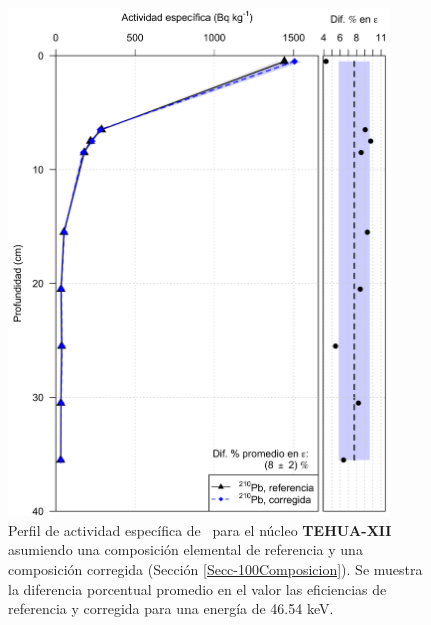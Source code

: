 \begin{figure}
\centering
\includegraphics[width=0.9\textwidth]{Imagenes/Act_210Pb_Agua_Composicion_TEHUA-XII.png}
\caption{Perfil de actividad específica de \PbCero\, para el núcleo \textbf{TEHUA-XII} asumiendo una composición elemental de referencia y una composición corregida (Sección \ref{Secc-100Composicion}). Se muestra la diferencia porcentual promedio en el valor las eficiencias de referencia y corregida para una energía de 46.54 keV.}\label{FigTEHUAXIIAgua}
\end{figure}
\newpage

